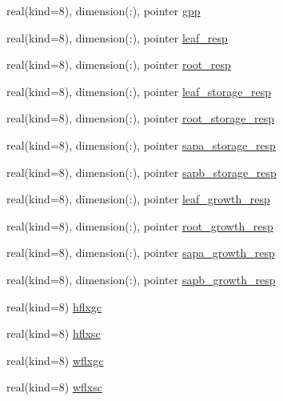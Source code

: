 \begin{DoxyCompactItemize}
\item 
real(kind=8), dimension(\+:), pointer \hyperlink{structrk4__coms_1_1rk4patchtype_ae6a5db5c86eebc9f625f961278270b71}{gpp}
\item 
real(kind=8), dimension(\+:), pointer \hyperlink{structrk4__coms_1_1rk4patchtype_ac3aa072626ca217bf005bf4c56ae377c}{leaf\+\_\+resp}
\item 
real(kind=8), dimension(\+:), pointer \hyperlink{structrk4__coms_1_1rk4patchtype_a61b4b403f794441d2420c99c061f3e1a}{root\+\_\+resp}
\item 
real(kind=8), dimension(\+:), pointer \hyperlink{structrk4__coms_1_1rk4patchtype_a1f877b29494f8df0b70d20dfb0d5dfb3}{leaf\+\_\+storage\+\_\+resp}
\item 
real(kind=8), dimension(\+:), pointer \hyperlink{structrk4__coms_1_1rk4patchtype_a5594d09c2ea31dc5cff44a48480c1137}{root\+\_\+storage\+\_\+resp}
\item 
real(kind=8), dimension(\+:), pointer \hyperlink{structrk4__coms_1_1rk4patchtype_af0ea3ebfc693b6e1638aa56e34c3299c}{sapa\+\_\+storage\+\_\+resp}
\item 
real(kind=8), dimension(\+:), pointer \hyperlink{structrk4__coms_1_1rk4patchtype_a04b1a427e2030adce6bb696a70737ed9}{sapb\+\_\+storage\+\_\+resp}
\item 
real(kind=8), dimension(\+:), pointer \hyperlink{structrk4__coms_1_1rk4patchtype_a2c4b8d52fdf956b7878d53a927640849}{leaf\+\_\+growth\+\_\+resp}
\item 
real(kind=8), dimension(\+:), pointer \hyperlink{structrk4__coms_1_1rk4patchtype_a9312ce306daa7cdeed197c4fdfea3c85}{root\+\_\+growth\+\_\+resp}
\item 
real(kind=8), dimension(\+:), pointer \hyperlink{structrk4__coms_1_1rk4patchtype_aa36ea68881490ec01e723ec4c9003299}{sapa\+\_\+growth\+\_\+resp}
\item 
real(kind=8), dimension(\+:), pointer \hyperlink{structrk4__coms_1_1rk4patchtype_a974bd5f894fe280d0ebdf89207ea54ad}{sapb\+\_\+growth\+\_\+resp}
\item 
real(kind=8) \hyperlink{structrk4__coms_1_1rk4patchtype_ac7baf351e7d3ce11b8aab8a2e98afad8}{hflxgc}
\item 
real(kind=8) \hyperlink{structrk4__coms_1_1rk4patchtype_a7540c3d1871291effdafe2ea27bcdbc0}{hflxsc}
\item 
real(kind=8) \hyperlink{structrk4__coms_1_1rk4patchtype_a67db60d6329fd2b32461956425cc3ea8}{wflxgc}
\item 
real(kind=8) \hyperlink{structrk4__coms_1_1rk4patchtype_aa631c62a6689340cbef04e7ee39317b2}{wflxsc}

\end{DoxyCompactItemize}
